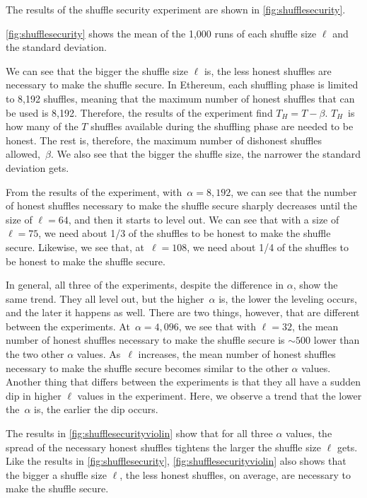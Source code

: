 The results of the shuffle security experiment are shown in \autoref{fig:shufflesecurity}.

\autoref{fig:shufflesecurity} shows the mean of the 1,000 runs of each shuffle size $\ell$ and the standard deviation.

We can see that the bigger the shuffle size $\ell$ is, the less honest shuffles are necessary to make the shuffle secure.
In Ethereum, each shuffling phase is limited to 8,192 shuffles, meaning that the maximum number of honest shuffles that can be used is 8,192.
Therefore, the results of the experiment find $T_H=T-\beta$.
$T_H$~is how many of the $T$ shuffles available during the shuffling phase are needed to be honest.
The rest is, therefore, the maximum number of dishonest shuffles allowed,~$\beta$.
We also see that the bigger the shuffle size, the narrower the standard deviation gets.

From the results of the experiment, with~$\alpha=8,192$, we can see that the number of honest shuffles necessary to make the shuffle secure sharply decreases until the size of $\ell=64$, and then it starts to level out.
We can see that with a size of $\ell=75$, we need about 1/3 of the shuffles to be honest to make the shuffle secure.
Likewise, we see that, at~$\ell=108$, we need about 1/4 of the shuffles to be honest to make the shuffle secure.

In general, all three of the experiments, despite the difference in $\alpha$, show the same trend.
They all level out, but the higher~$\alpha$ is, the lower the leveling occurs, and the later it happens as well.
There are two things, however, that are different between the experiments.
At~$\alpha=4,096$, we see that with $\ell=32$, the mean number of honest shuffles necessary to make the shuffle secure is $\sim 500$ lower than the two other $\alpha$ values.
As~$\ell$ increases, the mean number of honest shuffles necessary to make the shuffle secure becomes similar to the other $\alpha$ values.
Another thing that differs between the experiments is that they all have a sudden dip in higher $\ell$ values in the experiment.
Here, we observe a trend that the lower the~$\alpha$ is, the earlier the dip occurs.



The results in \autoref{fig:shufflesecurityviolin} show that for all three $\alpha$ values, the spread of the necessary honest shuffles tightens the larger the shuffle size $\ell$ gets.
Like the results in \autoref{fig:shufflesecurity}, \autoref{fig:shufflesecurityviolin} also shows that the bigger a shuffle size $\ell$, the less honest shuffles, on average, are necessary to make the shuffle secure.

